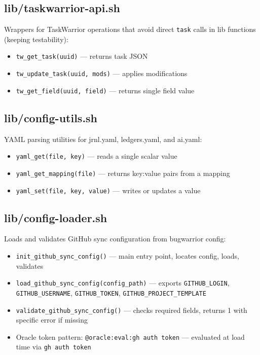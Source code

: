 \documentclass[
]{article}
\providecommand{\tightlist}{%
  \setlength{\itemsep}{0pt}\setlength{\parskip}{0pt}}
\begin{document}
\subsection{lib/taskwarrior-api.sh}\label{libtaskwarrior-api.sh}

Wrappers for TaskWarrior operations that avoid direct \texttt{task}
calls in lib functions (keeping testability):

\begin{itemize}
\tightlist
\item
  \texttt{tw\_get\_task(uuid)} --- returns task JSON
\item
  \texttt{tw\_update\_task(uuid,\ mods)} --- applies modifications
\item
  \texttt{tw\_get\_field(uuid,\ field)} --- returns single field value
\end{itemize}

\subsection{lib/config-utils.sh}\label{libconfig-utils.sh}

YAML parsing utilities for jrnl.yaml, ledgers.yaml, and ai.yaml:

\begin{itemize}
\tightlist
\item
  \texttt{yaml\_get(file,\ key)} --- reads a single scalar value
\item
  \texttt{yaml\_get\_mapping(file)} --- returns key:value pairs from a
  mapping
\item
  \texttt{yaml\_set(file,\ key,\ value)} --- writes or updates a value
\end{itemize}

\subsection{lib/config-loader.sh}\label{libconfig-loader.sh}

Loads and validates GitHub sync configuration from bugwarrior config:

\begin{itemize}
\tightlist
\item
  \texttt{init\_github\_sync\_config()} --- main entry point, locates
  config, loads, validates
\item
  \texttt{load\_github\_sync\_config(config\_path)} --- exports
  \texttt{GITHUB\_LOGIN}, \texttt{GITHUB\_USERNAME},
  \texttt{GITHUB\_TOKEN}, \texttt{GITHUB\_PROJECT\_TEMPLATE}
\item
  \texttt{validate\_github\_sync\_config()} --- checks required fields,
  returns 1 with specific error if missing
\item
  Oracle token pattern: \texttt{@oracle:eval:gh\ auth\ token} ---
  evaluated at load time via \texttt{gh\ auth\ token}
\end{itemize}
\end{document}
